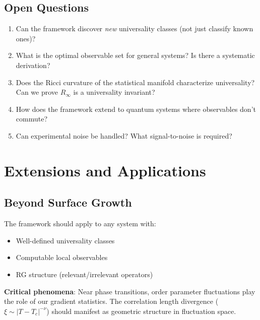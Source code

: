 \documentclass[aps,pre,twocolumn,superscriptaddress,showpacs,longbibliography]{revtex4-2}
\begin{document}
\subsection{Open Questions}

\begin{enumerate}
\item Can the framework discover \emph{new} universality classes (not just classify known ones)?

\item What is the optimal observable set for general systems? Is there a systematic derivation?

\item Does the Ricci curvature of the statistical manifold characterize universality? Can we prove $R_\infty$ is a universality invariant?

\item How does the framework extend to quantum systems where observables don't commute?

\item Can experimental noise be handled? What signal-to-noise is required?
\end{enumerate}

\section{Extensions and Applications}
\label{sec:extensions}

\subsection{Beyond Surface Growth}

The framework should apply to any system with:
\begin{itemize}
\item Well-defined universality classes
\item Computable local observables
\item RG structure (relevant/irrelevant operators)
\end{itemize}

\textbf{Critical phenomena}: Near phase transitions, order parameter fluctuations play the role of our gradient statistics. The correlation length divergence ($\xi \sim |T - T_c|^{-\nu}$) should manifest as geometric structure in fluctuation space.
\end{document}

